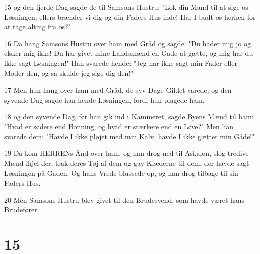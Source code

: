 \par 15 og den fjerde Dag sagde de til Samsons Hustru: "Lok din Mand til at sige os Løsningen, ellers brænder vi dig og din Faders Hus inde! Har I budt os herhen for at tage alting fra os?"
\par 16 Da hang Samsons Hustru over ham med Gråd og sagde: "Du hader mig jo og elsker mig ikke! Du har givet mine Landsmænd en Gåde at gætte, og mig har du ikke sagt Løsningen!" Han svarede hende: "Jeg har ikke sagt min Fader eller Moder den, og så skulde jeg sige dig den!"
\par 17 Men hun hang over ham med Gråd, de syv Dage Gildet varede; og den syvende Dag sagde han hende Løsningen, fordi hun plagede ham.
\par 18 og den syvende Dag, før han gik ind i Kammeret, sagde Byens Mænd til ham: "Hvad er sødere end Honning, og hvad er stærkere end en Løve?" Men han svarede dem: "Havde I ikke pløjet med min Kalv, havde I ikke gættet min Gåde!"
\par 19 Da kom HERRENs Ånd over ham, og han drog ned til Askalon, slog tredive Mænd ihjel der, trak deres Tøj af dem og gav Klæderne til dem, der havde sagt Løsningen på Gåden. Og hans Vrede blussede op, og han drog tilbage til sin Faders Hus.
\par 20 Men Samsons Hustru blev givet til den Brudesvend, som havde været hans Brudefører.

\chapter{15}

